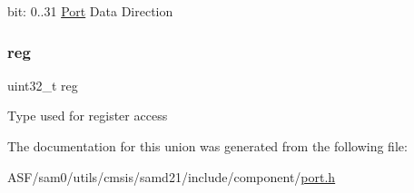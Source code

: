 bit\+: 0..31 \mbox{\hyperlink{struct_port}{Port}} Data Direction \mbox{\label{union_p_o_r_t___d_i_r___type_a6b91636401516a477989a336376d7b40}} 
\subsubsection{\texorpdfstring{reg}{reg}}
{\footnotesize\ttfamily uint32\+\_\+t reg}

Type used for register access 

The documentation for this union was generated from the following file\+:\begin{DoxyCompactItemize}
\item 
A\+S\+F/sam0/utils/cmsis/samd21/include/component/\mbox{\hyperlink{utils_2cmsis_2samd21_2include_2component_2port_8h}{port.\+h}}\end{DoxyCompactItemize}
